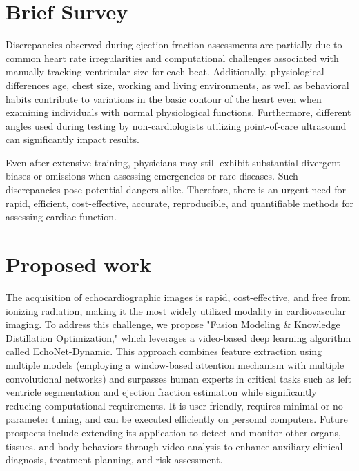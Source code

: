 \section{Brief Survey}
\label{sec:intro}

Discrepancies observed during ejection fraction assessments are partially due to common heart rate irregularities and computational challenges associated with manually tracking ventricular size for each beat. Additionally, physiological differences age, chest size, working and living environments, as well as behavioral habits contribute to variations in the basic contour of the heart even when examining individuals with normal physiological functions. Furthermore, different angles used during testing by non-cardiologists utilizing point-of-care ultrasound can significantly impact results.

Even after extensive training, physicians may still exhibit substantial divergent biases or omissions when assessing emergencies or rare diseases. Such discrepancies pose potential dangers alike. Therefore, there is an urgent need for rapid, efficient, cost-effective, accurate, reproducible, and quantifiable methods for assessing cardiac function.

\section{Proposed work}
The acquisition of echocardiographic images is rapid, cost-effective, and free from ionizing radiation, making it the most widely utilized modality in cardiovascular imaging. To address this challenge, we propose "Fusion Modeling \& Knowledge Distillation Optimization," which leverages a video-based deep learning algorithm called EchoNet-Dynamic. This approach combines feature extraction using multiple models (employing a window-based attention mechanism with multiple convolutional networks) and surpasses human experts in critical tasks such as left ventricle segmentation and ejection fraction estimation while significantly reducing computational requirements. It is user-friendly, requires minimal or no parameter tuning, and can be executed efficiently on personal computers. Future prospects include extending its application to detect and monitor other organs, tissues, and body behaviors through video analysis to enhance auxiliary clinical diagnosis, treatment planning, and risk assessment.
